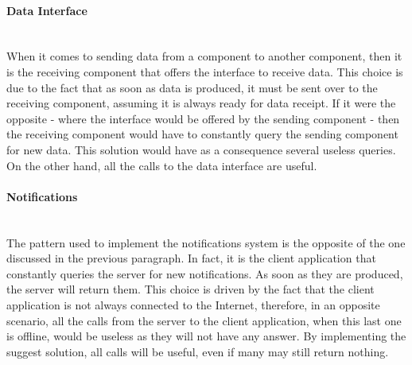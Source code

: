 \documentclass[../../DD.tex]{subfiles}
\begin{document}
	\paragraph{Data Interface}\mbox{}\\
	When it comes to sending data from a component to another component, then it is the receiving component that offers the interface to receive data. This choice is due to the fact that as soon as data is produced, it must be sent over to the receiving component, assuming it is always ready for data receipt. If it were the opposite - where the interface would be offered by the sending component - then the receiving component would have to constantly query the sending component for new data. This solution would have as a consequence several useless queries. On the other hand, all the calls to the data interface are useful.

	\paragraph{Notifications}\mbox{}\\
	The pattern used to implement the notifications system is the opposite of the one discussed in the previous paragraph. In fact, it is the client application that constantly queries the server for new notifications. As soon as they are produced, the server will return them. This choice is driven by the fact that the client application is not always connected to the Internet, therefore, in an opposite scenario, all the calls from the server to the client application, when this last one is offline, would be useless as they will not have any answer. By implementing the suggest solution, all calls will be useful, even if many may still return nothing.
\end{document}

